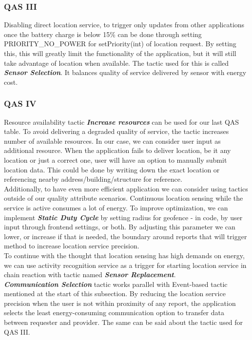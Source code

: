 \subsubsection{QAS III}
Disabling direct location service, to trigger only updates from other applications once the battery charge is below 15\% can be done through setting PRIORITY\_NO\_POWER for setPriority(int) of location request. By setting this, this will greatly limit the functionality of the application, but it will still take advantage of location when available. The tactic used for this is called \textbf{\textit{Sensor Selection}}. It balances quality of service delivered by sensor with energy cost.

\subsubsection{QAS IV}
Resource availability tactic \textbf{\textit{Increase resources}} can be used for our last QAS table. To avoid delivering a degraded quality of service, the tactic increases number of available resources. In our case, we can consider user input as additional resource. When the application fails to deliver location, be it any location or just a correct one, user will have an option to manually submit location data. This could be done by writing down the exact location or referencing nearby address/building/structure for reference.
~\\

Additionally, to have even more efficient application we can consider using tactics outside of our quality attribute scenarios. Continuous location sensing while the service is active consumes a lot of energy. To improve optimization, we can implement \textbf{\textit{Static Duty Cycle}} by setting radius for geofence - in code, by user input through frontend settings, or both. By adjusting this parameter we can lower, or increase if that is needed, the boundary around reports that will trigger method to increase location service precision.
~\\

To continue with the thought that location sensing has high demands on energy, we can use activity recognition service as a trigger for starting location service in chain reaction with tactic named \textbf{\textit{Sensor Replacement}}.
~\\

\textbf{\textit{Communication Selection}} tactic works parallel with Event-based tactic mentioned at the start of this subsection. By reducing the location service precision when the user is not within proximity of any report, the application selects the least energy-consuming communication option to transfer data between requester and provider. The same can be said about the tactic used for QAS III.
~\\

